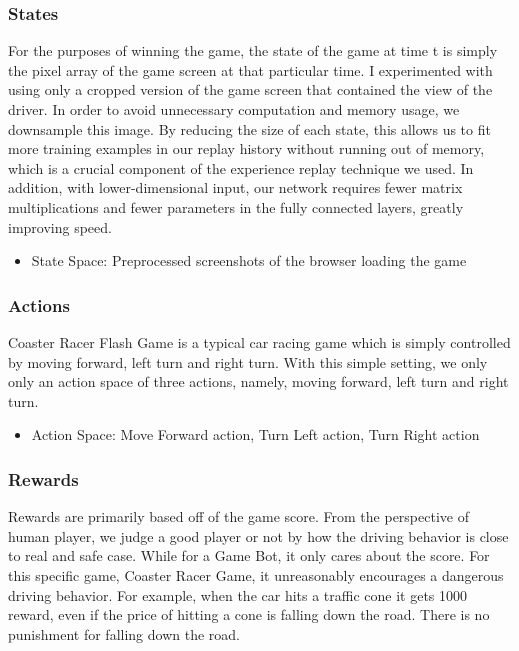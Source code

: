 \subsubsection{States}

For the purposes of winning the game, the state of the game at time t is simply the pixel array of the game screen at that particular time. I experimented with using only a cropped version of the game screen that contained the view of the driver. In order to avoid unnecessary computation and memory usage, we downsample this image. By reducing the size of each state, this allows us to fit more training examples in our replay history without running out of memory, which is a crucial component of the experience replay technique we used. In addition, with lower-dimensional input, our network requires fewer matrix multiplications and fewer parameters in the fully connected layers, greatly improving speed.

\begin{itemize}
		
	\item State Space: {Preprocessed screenshots of the browser loading the game}

\end{itemize}

\subsubsection{Actions}

Coaster Racer Flash Game is a typical car racing game which is simply controlled by moving forward, left turn and right turn. With this simple setting, we only only an action space of three actions, namely, moving forward, left turn and right turn.

\begin{itemize}
	
	\item Action Space: {Move Forward action, Turn Left action, Turn Right action}

\end{itemize}

\subsubsection{Rewards}

Rewards are primarily based off of the game score. From the perspective of human player, we judge a good player or not by how the driving behavior is close to real and safe case. While for a Game Bot, it only cares about the score. For this specific game, Coaster Racer Game, it unreasonably encourages a dangerous driving behavior. For example, when the car hits a traffic cone it gets 1000 reward, even if the price of hitting a cone is falling down the road. There is no punishment for falling down the road.

